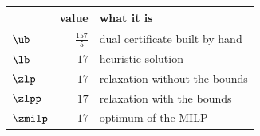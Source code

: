 \begin{center}\small
\begin{tabular}{lrl}
\toprule
 & value & what it is \\
\midrule
$\ub$ & $\frac{157}{5}$ & dual certificate built by hand \\
$\lb$ & $17$ & heuristic solution \\
$\zlp$ & $17$ & relaxation without the bounds \\
$\zlpp$ & $17$ & relaxation with the bounds \\
$\zmilp$ & $17$ & optimum of the MILP \\
\bottomrule
\end{tabular}
\end{center}
